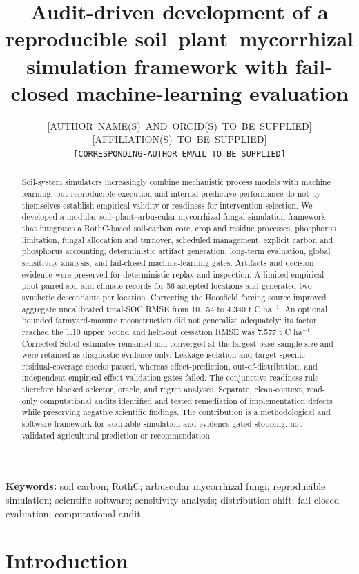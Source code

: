 \documentclass[11pt]{article}
\title{Audit-driven development of a reproducible soil--plant--mycorrhizal simulation framework with fail-closed machine-learning evaluation}
\author{\mbox{[AUTHOR NAME(S) AND ORCID(S) TO BE SUPPLIED]}\\
\mbox{[AFFILIATION(S) TO BE SUPPLIED]}\\
\texttt{[CORRESPONDING-AUTHOR EMAIL TO BE SUPPLIED]}}
\date{}
\newcommand{\unitC}{t C ha$^{-1}$}
\begin{document}
\maketitle

\begin{abstract}
Soil-system simulators increasingly combine mechanistic process models with machine learning, but reproducible execution and internal predictive performance do not by themselves establish empirical validity or readiness for intervention selection. We developed a modular soil--plant--arbuscular-mycorrhizal-fungal simulation framework that integrates a RothC-based soil-carbon core, crop and residue processes, phosphorus limitation, fungal allocation and turnover, scheduled management, explicit carbon and phosphorus accounting, deterministic artifact generation, long-term evaluation, global sensitivity analysis, and fail-closed machine-learning gates. Artifacts and decision evidence were preserved for deterministic replay and inspection. A limited empirical pilot paired soil and climate records for 56 accepted locations and generated two synthetic descendants per location. Correcting the Hoosfield forcing source improved aggregate uncalibrated total-SOC RMSE from 10.154 to 4.340 \unitC. An optional bounded farmyard-manure reconstruction did not generalize adequately: its factor reached the 1.10 upper bound and held-out cessation RMSE was 7.577 \unitC. Corrected Sobol estimates remained non-converged at the largest base sample size and were retained as diagnostic evidence only. Leakage-isolation and target-specific residual-coverage checks passed, whereas effect-prediction, out-of-distribution, and independent empirical effect-validation gates failed. The conjunctive readiness rule therefore blocked selector, oracle, and regret analyses. Separate, clean-context, read-only computational audits identified and tested remediation of implementation defects while preserving negative scientific findings. The contribution is a methodological and software framework for auditable simulation and evidence-gated stopping, not validated agricultural prediction or recommendation.
\end{abstract}

\noindent\textbf{Keywords:} soil carbon; RothC; arbuscular mycorrhizal fungi; reproducible simulation; scientific software; sensitivity analysis; distribution shift; fail-closed evaluation; computational audit

\section{Introduction}
\end{document}
